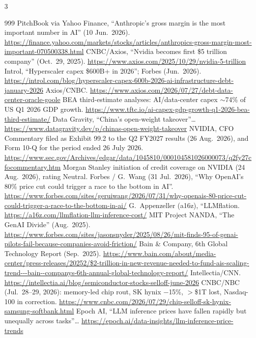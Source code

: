 \begin{multicols}{3}
\begin{thebibliography}{999}
 PitchBook via Yahoo Finance, ``Anthropic's gross margin is the most important number in AI'' (10 Jun.\ 2026). \url{https://finance.yahoo.com/markets/stocks/articles/anthropics-gross-margin-most-important-070500338.html}
 CNBC/Axios, ``Nvidia becomes first \$5 trillion company'' (Oct.\ 29, 2025). \url{https://www.axios.com/2025/10/29/nvidia-5-trillion}
 Introl, ``Hyperscaler capex \$600B+ in 2026''; Forbes (Jun.\ 2026). \url{https://introl.com/blog/hyperscaler-capex-600b-2026-ai-infrastructure-debt-january-2026}
 Axios/CNBC. \url{https://www.axios.com/2026/07/27/debt-data-center-oracle-goole}
 BEA third-estimate analyses: AI/data-center capex $\sim$74\% of US Q1 2026 GDP growth. \url{https://www.tftc.io/ai-capex-gdp-growth-q1-2026-bea-third-estimate/}
 Data Gravity, ``China's open-weight takeover''… \url{https://www.datagravity.dev/p/chinas-open-weight-takeover}
 NVIDIA, CFO Commentary filed as Exhibit 99.2 to the Q2 FY2027 results (26 Aug.\ 2026), and Form 10-Q for the period ended 26 July 2026. \url{https://www.sec.gov/Archives/edgar/data/1045810/000104581026000073/q2fy27cfocommentary.htm}
 Morgan Stanley initiation of credit coverage on NVIDIA (24 Aug.\ 2026), rating Neutral.
 Forbes / G.~Wang (31 Jul.\ 2026), ``Why OpenAI's 80\% price cut could trigger a race to the bottom in AI''. \url{https://www.forbes.com/sites/geruiwang/2026/07/31/why-openais-80-price-cut-could-trigger-a-race-to-the-bottom-in-ai/}
 G.~Appenzeller (a16z), ``LLMflation. \url{https://a16z.com/llmflation-llm-inference-cost/}
 MIT Project NANDA, ``The GenAI Divide'' (Aug.\ 2025). \url{https://www.forbes.com/sites/jasonsnyder/2025/08/26/mit-finds-95-of-genai-pilots-fail-because-companies-avoid-friction/}
 Bain \& Company, 6th Global Technology Report (Sep.\ 2025). \url{https://www.bain.com/about/media-center/press-releases/20252/$2-trillion-in-new-revenue-needed-to-fund-ais-scaling-trend---bain--companys-6th-annual-global-technology-report/}
 Intellectia/CNN. \url{https://intellectia.ai/blog/semiconductor-stocks-selloff-june-2026}
 CNBC/NBC (Jul.\ 28--29, 2026): memory-led chip rout, SK hynix $-$15\%, $>$\$1T lost, Nasdaq-100 in correction. \url{https://www.cnbc.com/2026/07/29/chip-selloff-sk-hynix-samsung-softbank.html}
 Epoch AI, ``LLM inference prices have fallen rapidly but unequally across tasks''… \url{https://epoch.ai/data-insights/llm-inference-price-trends}

\end{thebibliography}
\end{multicols}
